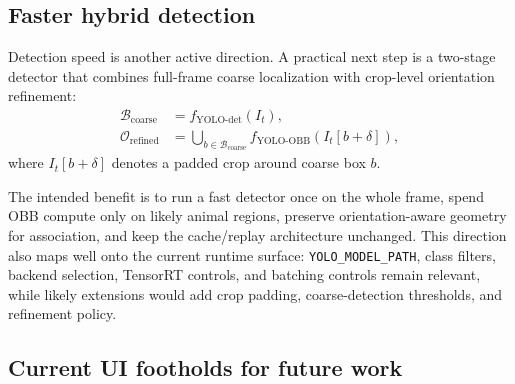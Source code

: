 \documentclass[11pt]{article}
\newcommand{\runtimekey}[1]{\texttt{#1}}
\begin{document}
\subsection{Faster hybrid detection}

Detection speed is another active direction. A practical next step is a two-stage detector that combines full-frame coarse localization with crop-level orientation refinement:
\begin{align}
  \mathcal{B}_{\text{coarse}} &= f_{\text{YOLO-det}}(I_t), \\
  \mathcal{O}_{\text{refined}} &= \bigcup_{b \in \mathcal{B}_{\text{coarse}}}
  f_{\text{YOLO-OBB}}\!\left(I_t[b + \delta]\right),
\end{align}
where $I_t[b + \delta]$ denotes a padded crop around coarse box $b$.

The intended benefit is to run a fast detector once on the whole frame, spend OBB compute only on likely animal regions, preserve orientation-aware geometry for association, and keep the cache/replay architecture unchanged. This direction also maps well onto the current runtime surface: \runtimekey{YOLO\_MODEL\_PATH}, class filters, backend selection, TensorRT controls, and batching controls remain relevant, while likely extensions would add crop padding, coarse-detection thresholds, and refinement policy.

\subsection{Current UI footholds for future work}
\end{document}
